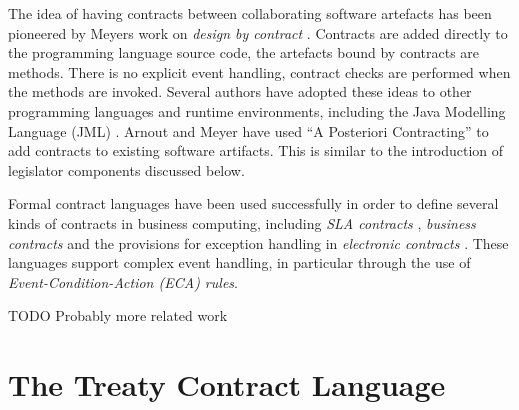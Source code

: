 \documentclass{llncs}
\begin{document}

The idea of having contracts between collaborating software artefacts has been pioneered by Meyers work on \textit{design by contract} \cite{DesignByContract,meyerOOSC}. Contracts are added directly to the programming language source code, the artefacts bound by contracts are methods. There is no explicit event handling, contract checks are performed when the methods are invoked. Several authors have adopted these ideas to other programming languages and runtime environments, including the Java Modelling Language (JML) \cite{DBLP:conf/fmco/ChalinKLP05}. Arnout and Meyer  \cite{ArnoutMeyer2003b} have used ``A Posteriori Contracting'' to add contracts to existing software artifacts. This is similar to the introduction of legislator components discussed below.   

Formal contract languages have been used successfully in order to define several kinds of contracts in business computing, including \textit{SLA contracts} \cite{PaschkeDietrich2005}, \textit{business contracts} \cite{Linington04} \cite{Governatori05} \cite{Governatori06} and the provisions for exception handling in \textit{electronic contracts} \cite{SweetDeal}. These languages support complex event handling, in particular through the use of \textit{Event-Condition-Action (ECA) rules}.  

TODO Probably more related work



\section{The Treaty Contract Language}
\label{section:treaty}
\end{document}
